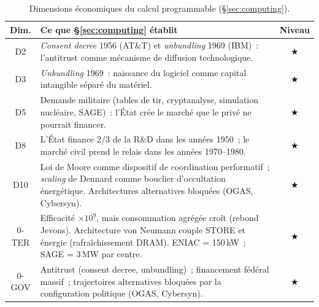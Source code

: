 


\begin{table}[htbp]
\caption{Dimensions économiques du calcul programmable (§\ref{sec:computing}).}\label{tab:computing-dimensions}
\centering\small
\renewcommand{\arraystretch}{1.15}
\begin{tabularx}{\textwidth}{@{}cXc@{}}
\toprule
\textbf{Dim.} & \textbf{Ce que §\ref{sec:computing} établit} & \textbf{Niveau} \\
\midrule
D2 & \emph{Consent decree} 1956 (AT\&T) et \emph{unbundling} 1969 (IBM)~: l'antitrust comme mécanisme de diffusion technologique. & ★ \\
D3 & \emph{Unbundling} 1969~: naissance du logiciel comme capital intangible séparé du matériel. & ★ \\
D5 & Demande militaire (tables de tir, cryptanalyse, simulation nucléaire, SAGE)~: l'État crée le marché que le privé ne pourrait financer. & ★ \\
D8 & L'État finance 2/3 de la R\&D dans les années 1950~; le marché civil prend le relais dans les années 1970--1980. & ★ \\
D10 & Loi de Moore comme dispositif de coordination performatif~; \emph{scaling} de Dennard comme bouclier d'occultation énergétique. Architectures alternatives bloquées (OGAS, Cybersyn). & ★ \\
\midrule
0-TER & Efficacité $\times 10^{9}$, mais consommation agrégée croît (rebond Jevons). Architecture von Neumann couple STORE et énergie (rafraîchissement DRAM). ENIAC = 150\,kW~; SAGE = 3\,MW par centre. & ★ \\
0-GOV & Antitrust (consent decree, unbundling)~; financement fédéral massif~; trajectoires alternatives bloquées par la configuration politique (OGAS, Cybersyn). & ★ \\
\bottomrule
\end{tabularx}
\renewcommand{\arraystretch}{1.0}
\end{table}